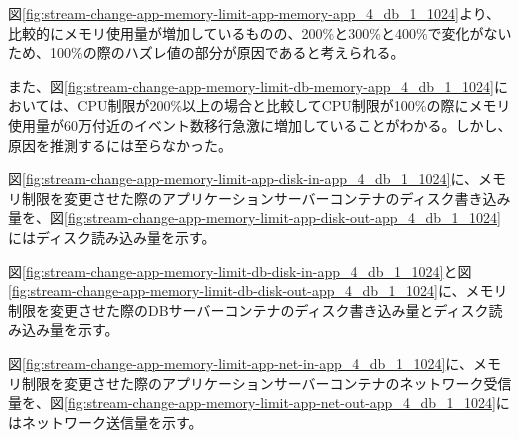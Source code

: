 \documentclass[../../../../main]{subfiles}
\begin{document}
    

    

    図\ref{fig:stream-change-app-memory-limit-app-memory-app_4_db_1_1024}より、比較的にメモリ使用量が増加しているものの、200\%と300\%と400\%で変化がないため、100\%の際のハズレ値の部分が原因であると考えられる。

    また、図\ref{fig:stream-change-app-memory-limit-db-memory-app_4_db_1_1024}においては、CPU制限が200\%以上の場合と比較してCPU制限が100\%の際にメモリ使用量が60万付近のイベント数移行急激に増加していることがわかる。しかし、原因を推測するには至らなかった。


    図\ref{fig:stream-change-app-memory-limit-app-disk-in-app_4_db_1_1024}に、メモリ制限を変更させた際のアプリケーションサーバーコンテナのディスク書き込み量を、図\ref{fig:stream-change-app-memory-limit-app-disk-out-app_4_db_1_1024}にはディスク読み込み量を示す。

    
    

    図\ref{fig:stream-change-app-memory-limit-db-disk-in-app_4_db_1_1024}と図\ref{fig:stream-change-app-memory-limit-db-disk-out-app_4_db_1_1024}に、メモリ制限を変更させた際のDBサーバーコンテナのディスク書き込み量とディスク読み込み量を示す。

    
    


    図\ref{fig:stream-change-app-memory-limit-app-net-in-app_4_db_1_1024}に、メモリ制限を変更させた際のアプリケーションサーバーコンテナのネットワーク受信量を、図\ref{fig:stream-change-app-memory-limit-app-net-out-app_4_db_1_1024}にはネットワーク送信量を示す。

    
    
\end{document}
